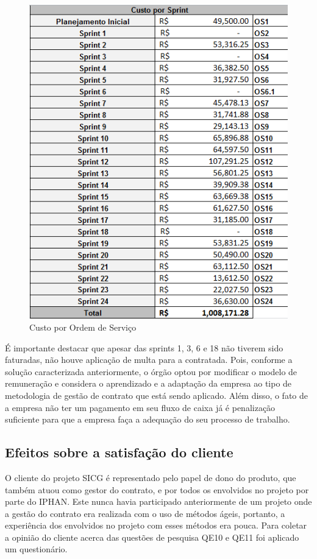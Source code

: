 \begin{figure}[H]
		\centering
			\includegraphics[scale=1.0]{figuras/custo.png}
		\caption{Custo por Ordem de Serviço}
		\label{custo}
\end{figure}

É importante destacar que apesar das sprints 1, 3, 6 e 18 não tiverem sido faturadas, não houve aplicação de multa para a contratada. Pois, conforme a solução caracterizada anteriormente, o órgão optou por modificar o modelo de remuneração e considera o aprendizado e a adaptação da empresa ao tipo de metodologia de gestão de contrato que está sendo aplicado. Além disso, o fato de a empresa não ter um pagamento em seu fluxo de caixa já é penalização suficiente para que a empresa faça a adequação do seu processo de trabalho.

\subsection[Efeitos sobre a satisfação do cliente]{Efeitos sobre a satisfação do cliente}

O cliente do projeto SICG é representado pelo papel de dono do produto, que também atuou como gestor do contrato, e por todos os envolvidos no projeto por parte do IPHAN. Este nunca havia participado anteriormente de um projeto onde a gestão do contrato era realizada com o uso de métodos ágeis, portanto, a experiência dos envolvidos no projeto com esses métodos era pouca. Para coletar a opinião do cliente acerca das questões de pesquisa QE10  e QE11 foi aplicado um questionário.

